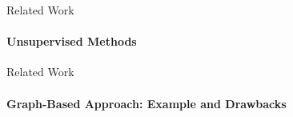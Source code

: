   \begin{frame}{Related Work}
    \framesubtitle{Unsupervised Methods}
  \end{frame}

  \begin{frame}{Related Work}
    \framesubtitle{Graph-Based Approach: Example and Drawbacks}
  \end{frame}

